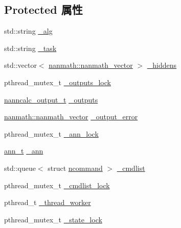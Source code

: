 \subsection*{Protected 属性}
\begin{DoxyCompactItemize}
\item 
std\+::string \hyperlink{classnanai_1_1nanai__ann__nanncalc_a66ab62c75be9da3951abd85e1eb296e0}{\+\_\+alg}
\item 
std\+::string \hyperlink{classnanai_1_1nanai__ann__nanncalc_ab659b8655ab02f5922ecb19c6418f02c}{\+\_\+task}
\item 
std\+::vector$<$ \hyperlink{classnanmath_1_1nanmath__vector}{nanmath\+::nanmath\+\_\+vector} $>$ \hyperlink{classnanai_1_1nanai__ann__nanncalc_a1e15116b2a2d7b5c8ddb9579de11f5ae}{\+\_\+hiddens}
\item 
pthread\+\_\+mutex\+\_\+t \hyperlink{classnanai_1_1nanai__ann__nanncalc_a1c9006356f22904fee12c3635cdc8a15}{\+\_\+outputs\+\_\+lock}
\item 
\hyperlink{classnanai_1_1nanai__ann__nanncalc_a44c56088d31cafacdb5324d36a88fd51}{nanncalc\+\_\+output\+\_\+t} \hyperlink{classnanai_1_1nanai__ann__nanncalc_a5f1c5597b0e11d5e8bea297fcc48979d}{\+\_\+outputs}
\item 
\hyperlink{classnanmath_1_1nanmath__vector}{nanmath\+::nanmath\+\_\+vector} \hyperlink{classnanai_1_1nanai__ann__nanncalc_abee00d840fe641d5c69aa1c621333179}{\+\_\+output\+\_\+error}
\item 
pthread\+\_\+mutex\+\_\+t \hyperlink{classnanai_1_1nanai__ann__nanncalc_ab05880760848bb308d30833b362f60a8}{\+\_\+ann\+\_\+lock}
\item 
\hyperlink{classnanai_1_1nanai__ann__nanncalc_1_1ann__t}{ann\+\_\+t} \hyperlink{classnanai_1_1nanai__ann__nanncalc_a3b0bfac7c99ef9d83769efd2936e4638}{\+\_\+ann}
\item 
std\+::queue$<$ struct \hyperlink{structnanai_1_1nanai__ann__nanncalc_1_1ncommand}{ncommand} $>$ \hyperlink{classnanai_1_1nanai__ann__nanncalc_a9af0b8bc21e0d398f3f9489acf1dfab7}{\+\_\+cmdlist}
\item 
pthread\+\_\+mutex\+\_\+t \hyperlink{classnanai_1_1nanai__ann__nanncalc_a92213def4dd3f7f0693159a79446ea09}{\+\_\+cmdlist\+\_\+lock}
\item 
pthread\+\_\+t \hyperlink{classnanai_1_1nanai__ann__nanncalc_ad8115ff56ea159a5e1d43c9752ed5936}{\+\_\+thread\+\_\+worker}
\item 
pthread\+\_\+mutex\+\_\+t \hyperlink{classnanai_1_1nanai__ann__nanncalc_a25ab2c0cf73a5ff7201ad1cd339626dc}{\+\_\+state\+\_\+lock}

\end{DoxyCompactItemize}
